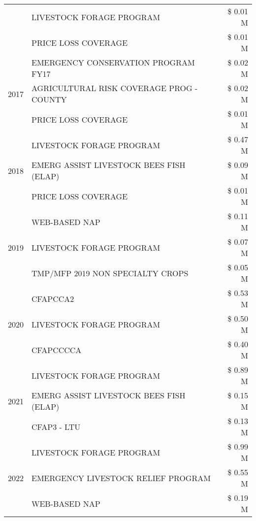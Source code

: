 \begin{tabular}{llr}
 & LIVESTOCK FORAGE PROGRAM & \$ 0.01 M \\
 & PRICE LOSS COVERAGE & \$ 0.01 M \\
\cline{1-3}
\multirow[t]{3}{*}{2017} & EMERGENCY CONSERVATION PROGRAM FY17 & \$ 0.02 M \\
 & AGRICULTURAL RISK COVERAGE PROG - COUNTY & \$ 0.02 M \\
 & PRICE LOSS COVERAGE & \$ 0.01 M \\
\cline{1-3}
\multirow[t]{3}{*}{2018} & LIVESTOCK FORAGE PROGRAM & \$ 0.47 M \\
 & EMERG ASSIST LIVESTOCK BEES FISH (ELAP) & \$ 0.09 M \\
 & PRICE LOSS COVERAGE & \$ 0.01 M \\
\cline{1-3}
\multirow[t]{3}{*}{2019} & WEB-BASED NAP & \$ 0.11 M \\
 & LIVESTOCK FORAGE PROGRAM & \$ 0.07 M \\
 & TMP/MFP 2019 NON SPECIALTY CROPS & \$ 0.05 M \\
\cline{1-3}
\multirow[t]{3}{*}{2020} & CFAPCCA2 & \$ 0.53 M \\
 & LIVESTOCK FORAGE PROGRAM & \$ 0.50 M \\
 & CFAPCCCCA & \$ 0.40 M \\
\cline{1-3}
\multirow[t]{3}{*}{2021} & LIVESTOCK FORAGE PROGRAM & \$ 0.89 M \\
 & EMERG ASSIST LIVESTOCK BEES FISH (ELAP) & \$ 0.15 M \\
 & CFAP3 - LTU & \$ 0.13 M \\
\cline{1-3}
\multirow[t]{3}{*}{2022} & LIVESTOCK FORAGE PROGRAM & \$ 0.99 M \\
 & EMERGENCY LIVESTOCK RELIEF PROGRAM & \$ 0.55 M \\
 & WEB-BASED NAP & \$ 0.19 M \\
\cline{1-3}
\bottomrule
\end{tabular}

